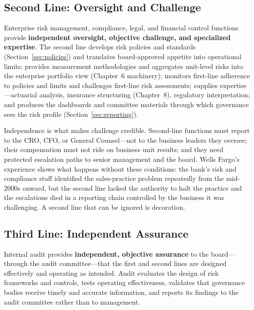 \documentclass[11pt,openany]{book}
\begin{document}
\subsection{Second Line: Oversight and Challenge}
\label{subsec:second-line}

Enterprise risk management, compliance, legal, and financial control
functions provide \textbf{independent oversight, objective challenge, and
specialized expertise}. The second line develops risk policies and standards
(Section~\ref{sec:policies}) and translates board-approved appetite into
operational limits; provides measurement methodologies and aggregates
unit-level risks into the enterprise portfolio view (Chapter~6 machinery);
monitors first-line adherence to policies and limits and challenges
first-line risk assessments; supplies expertise---actuarial analysis,
insurance structuring (Chapter~8), regulatory interpretation; and produces
the dashboards and committee materials through which governance sees the risk
profile (Section~\ref{sec:reporting}).

Independence is what makes challenge credible. Second-line functions must
report to the CRO, CFO, or General Counsel---not to the business leaders they
oversee; their compensation must not ride on business unit results; and they
need protected escalation paths to senior management and the board. Wells
Fargo's experience shows what happens without these conditions: the bank's
risk and compliance staff identified the sales-practice problem repeatedly
from the mid-2000s onward, but the second line lacked the authority to halt
the practice and the escalations died in a reporting chain controlled by the
business it was challenging. A second line that can be ignored is decoration.

\subsection{Third Line: Independent Assurance}

Internal audit provides \textbf{independent, objective assurance} to the
board---through the audit committee---that the first and second lines are
designed effectively and operating as intended. Audit evaluates the design of
risk frameworks and controls, tests operating effectiveness, validates that
governance bodies receive timely and accurate information, and reports its
findings to the audit committee rather than to management.
\end{document}
